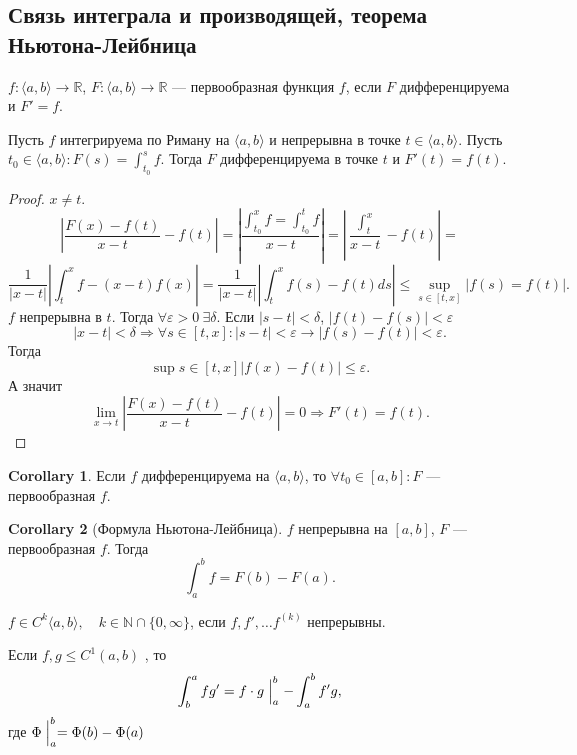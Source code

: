 \documentclass[11pt]{book}
\newcommand{\N}{\mathbb{N}}
\newcommand{\R}{\mathbb{R}}
\renewcommand{\le}{\leqslant}
\theoremstyle{definition}
\theoremstyle{plain}
\theoremstyle{plain}
\theoremstyle{definition}
\newtheorem*{cor}{Corollary}
\theoremstyle{remark}
\begin{document}
\subsection{Связь интеграла и производящей, теорема Ньютона-Лейбница}
$ f : \langle a, b \rangle  \to  \R$, $ F: \langle a, b \rangle \to  \R$ --- первообразная функция $ f$, если $ F$   дифференцируема и $ F' = f$.
\begin{thm}
    Пусть $ f$ интегрируема по Риману на $ \langle a, b \rangle$ и непрерывна в точке $ t \in  \langle a, b \rangle$. Пусть $ t_0 \in  \langle a, b \rangle: F(s) = \int_{t_0} ^{s} f$.
    Тогда $ F$   дифференцируема в точке $ t$ и $ F'(t) = f(t)$.
\end{thm}
\begin{proof}
    $ x \ne t$.\[
	\left |	\frac{F(x) - f(t)}{x-t} - f(t) \right | = \left| \frac{\int_{t_0}^{x} f = \int_{t_0} ^{t} f}{x - t} \right| = \left| \frac{\int_t^{x}}{x - t} - f(t) \right|  =
    \]
    \[
	\frac{1}{|x-t|} \left| \int _t ^{ x} f - (x-t)f(x) \right|  = \frac{1}{|x-t|}\left |{\int_t ^{x} f(s) - f(t) ds } \right | \le  \sup_{s \in  [t, x] } |f(s) = f(t)|
    .\]
    $ f$   непрерывна в $ t$. Тогда $ \forall  \varepsilon  > 0 ~ \exists  \delta  $. Если $| s- t| < \delta$, $ |f(t) - f(s) |< \varepsilon $
    \[
	|x - t| < \delta  \Longrightarrow \forall s \in  [t, x]: |s - t| < \varepsilon  \to |f(s) - f(t) | < \varepsilon
    .\]
    Тогда \[
	\sup{s \in [t, x]} |f(x) - f(t)| \le  \varepsilon
    .\]
    А значит \[
	\lim_{x \to  t} |\frac{F(x) - f(t)}{x -t}- f(t)| = 0 \Longrightarrow F'(t) = f(t)
    .\]
\end{proof}
\begin{cor}
    Если $ f$ дифференцируема на $ \langle a, b \rangle$, то $ \forall t_0 \in  [a, b]: F $ ---первообразная $ f$.
\end{cor}
\begin{cor}[Формула Ньютона-Лейбница]
    $ f$   непрерывна на $ [a, b]$, $ F$ ---первообразная $ f$. Тогда \[
	\int_a^{b} f = F(b) - F(a)
    .\]
\end{cor}
\begin{defn}
    $ f \in  C^{k} \langle a, b \rangle, \quad k \in \N \cap  \{0,  \infty\}$, если $ f, f', \ldots f^{(k)} $   непрерывны.
\end{defn}
\begin{thm}
    Если $ f, g \le  C^{1} (a, b)$ , то
    \[
	\int _b ^{a} f g' = f \cdot g \Bigm| _a ^{ b} - \int_a ^{ b} f' g
    ,\]
    где $ \Phi \Bigm| _a ^{ b} = \Phi(b) - \Phi(a)$
\end{thm}
\end{document}
